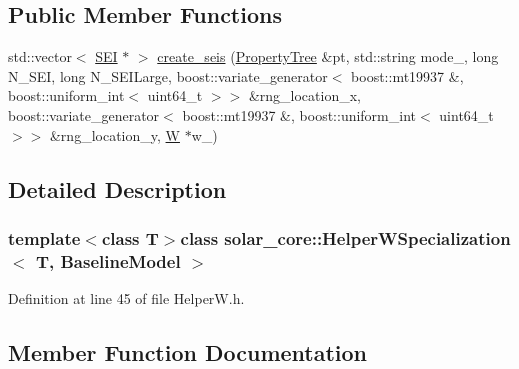 \subsection*{Public Member Functions}
\begin{DoxyCompactItemize}
\item 
std\+::vector$<$ \hyperlink{classsolar__core_1_1_s_e_i}{S\+E\+I} $\ast$ $>$ \hyperlink{classsolar__core_1_1_helper_w_specialization_3_01_t_00_01_baseline_model_01_4_a9f9f25055cdc6e402ae717b540a1feac}{create\+\_\+seis} (\hyperlink{namespacesolar__core_adeda2737d6938c190eb774a5b2495045}{Property\+Tree} \&pt, std\+::string mode\+\_\+, long N\+\_\+\+S\+E\+I, long N\+\_\+\+S\+E\+I\+Large, boost\+::variate\+\_\+generator$<$ boost\+::mt19937 \&, boost\+::uniform\+\_\+int$<$ uint64\+\_\+t $>$$>$ \&rng\+\_\+location\+\_\+x, boost\+::variate\+\_\+generator$<$ boost\+::mt19937 \&, boost\+::uniform\+\_\+int$<$ uint64\+\_\+t $>$$>$ \&rng\+\_\+location\+\_\+y, \hyperlink{classsolar__core_1_1_w}{W} $\ast$w\+\_\+)
\end{DoxyCompactItemize}


\subsection{Detailed Description}
\subsubsection*{template$<$class T$>$class solar\+\_\+core\+::\+Helper\+W\+Specialization$<$ T, Baseline\+Model $>$}



Definition at line 45 of file Helper\+W.\+h.



\subsection{Member Function Documentation}
\hypertarget{classsolar__core_1_1_helper_w_specialization_3_01_t_00_01_baseline_model_01_4_a9f9f25055cdc6e402ae717b540a1feac}{}
